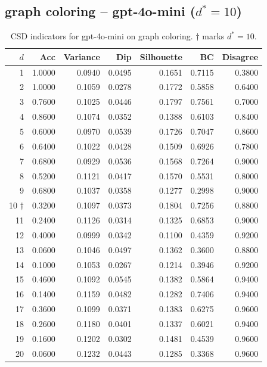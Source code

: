 \documentclass[11pt]{article}
\begin{document}
\subsection{graph coloring -- gpt-4o-mini ($d^*=10$)}

\begin{table}[h]\centering\small
\begin{tabular}{r|r|r|r|r|r|r}
\toprule
$d$ & Acc & Variance & Dip & Silhouette & BC & Disagree \\
\midrule
1 & 1.0000 & 0.0940 & 0.0495 & 0.1651 & 0.7115 & 0.3800 \\
2 & 1.0000 & 0.1059 & 0.0278 & 0.1772 & 0.5858 & 0.6400 \\
3 & 0.7600 & 0.1025 & 0.0446 & 0.1797 & 0.7561 & 0.7000 \\
4 & 0.8600 & 0.1074 & 0.0352 & 0.1388 & 0.6103 & 0.8400 \\
5 & 0.6000 & 0.0970 & 0.0539 & 0.1726 & 0.7047 & 0.8600 \\
6 & 0.6400 & 0.1022 & 0.0428 & 0.1509 & 0.6926 & 0.7800 \\
7 & 0.6800 & 0.0929 & 0.0536 & 0.1568 & 0.7264 & 0.9000 \\
8 & 0.5200 & 0.1121 & 0.0417 & 0.1570 & 0.5531 & 0.8000 \\
9 & 0.6800 & 0.1037 & 0.0358 & 0.1277 & 0.2998 & 0.9000 \\
10 $\dagger$ & 0.3200 & 0.1097 & 0.0373 & 0.1804 & 0.7256 & 0.8800 \\
11 & 0.2400 & 0.1126 & 0.0314 & 0.1325 & 0.6853 & 0.9000 \\
12 & 0.4000 & 0.0999 & 0.0342 & 0.1100 & 0.4359 & 0.9200 \\
13 & 0.0600 & 0.1046 & 0.0497 & 0.1362 & 0.3600 & 0.8800 \\
14 & 0.1000 & 0.1053 & 0.0267 & 0.1214 & 0.3946 & 0.9200 \\
15 & 0.4600 & 0.1092 & 0.0545 & 0.1382 & 0.5864 & 0.9400 \\
16 & 0.1400 & 0.1159 & 0.0482 & 0.1282 & 0.7406 & 0.9400 \\
17 & 0.3600 & 0.1099 & 0.0371 & 0.1383 & 0.6275 & 0.9600 \\
18 & 0.2600 & 0.1180 & 0.0401 & 0.1337 & 0.6021 & 0.9400 \\
19 & 0.1600 & 0.1202 & 0.0302 & 0.1481 & 0.4539 & 0.9600 \\
20 & 0.0600 & 0.1232 & 0.0443 & 0.1285 & 0.3368 & 0.9600 \\
\bottomrule
\end{tabular}
\caption{CSD indicators for gpt-4o-mini on graph coloring. $\dagger$ marks $d^*=10$.}
\end{table}
\end{document}
